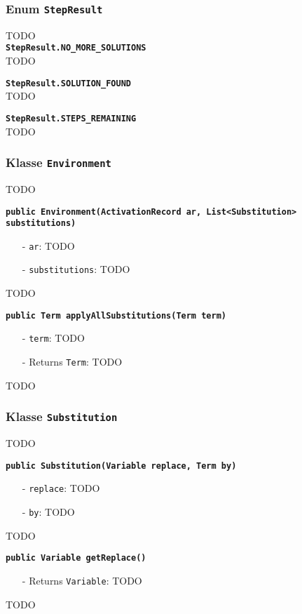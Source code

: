 \documentclass[parskip=full,11pt,twoside]{scrartcl}
\begin{document}
\subsubsection{Enum \texttt{StepResult}}
TODO\\

\textbf{\texttt{StepResult.NO\_MORE\_SOLUTIONS}}\\
TODO

\textbf{\texttt{StepResult.SOLUTION\_FOUND}}\\
TODO

\textbf{\texttt{StepResult.STEPS\_REMAINING}}\\
TODO

\subsubsection{Klasse \texttt{Environment}}
TODO

\textbf{\texttt{public Environment(ActivationRecord ar, List<Substitution>\\ substitutions)}}
\begin{itemize}[noitemsep]
	\item[-] \texttt{ar}: TODO
	\item[-] \texttt{substitutions}: TODO
\end{itemize}
TODO

\textbf{\texttt{public Term applyAllSubstitutions(Term term)}}
\begin{itemize}[noitemsep]
	\item[-] \texttt{term}: TODO
	\item[-] Returns \texttt{Term}: TODO
\end{itemize}
TODO

\subsubsection{Klasse \texttt{Substitution}}
TODO

\textbf{\texttt{public Substitution(Variable replace, Term by)}}
\begin{itemize}[noitemsep]
	\item[-] \texttt{replace}: TODO
	\item[-] \texttt{by}: TODO
\end{itemize}
TODO

\textbf{\texttt{public Variable getReplace()}}
\begin{itemize}[noitemsep]
	\item[-] Returns \texttt{Variable}: TODO
\end{itemize}
TODO
\end{document}
